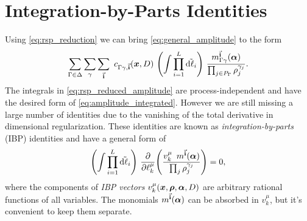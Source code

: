 

\section{Integration-by-Parts Identities}
\label{sec:ibp}


Using \cref{eq:rsp_reduction} we can bring \cref{eq:general_amplitude} to the form 
\begin{equation} \label{eq:rsp_reduced_amplitude}
  \sum_{\Gamma \in \Delta} \sum_{\gamma} \sum_{\va{i}} ~ c_{\Gamma\gamma, \va{i}} (\vb*{x},D) ~ 
  \qty(\int \prod_{i=1}^{L} \tilde{\dd{\ell_i}}) ~  
  \frac{m^{\va{i}}_{\Gamma\gamma}(\vb*{\alpha})%
    }{\prod_{j\in P_\Gamma} \rho_j^{\gamma_{j}}}.
\end{equation}
The integrals in \cref{eq:rsp_reduced_amplitude} are process-independent and have the desired form of \cref{eq:amplitude_integrated}.
However we are still missing a large number of identities due to the vanishing of the total derivative in dimensional regularization.
These identities are known as \emph{integration-by-parts} (IBP) identities \cite{Chetyrkin:1981qh,Tkachov:1981wb} and have a general
form of
\begin{equation}
  \qty(\int \prod_{i=1}^{L} \tilde{\dd{\ell_i}}) ~  \pdv{\ell_k^\mu}(
  \frac{ v_k^\mu \ommit{(\vb*{x},\vb*{\rho},\vb*{\alpha},D)} ~ \, m^{\va{i}}(\vb*{\alpha})
    }{\prod_{j} \rho_j^{\gamma_{j}}}
    ) = 0,
  \label{eq:ibps}
\end{equation}
where the components of \emph{IBP vectors} $v_k^\mu(\vb*{x},\vb*{\rho},\vb*{\alpha},D)$ are arbitrary rational functions
of all variables. The monomials $m^{\va{i}}(\vb*{\alpha})$ can be absorbed in $v_k^\mu$, but
it's convenient to keep them separate.


